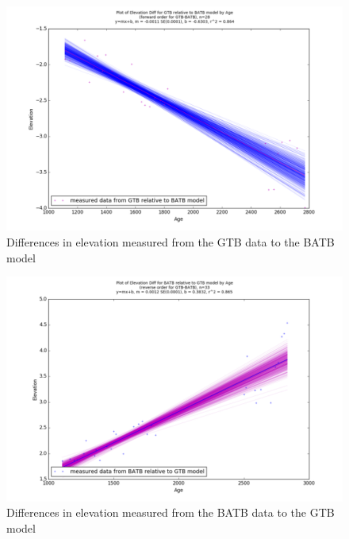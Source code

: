 \begin{figure}[h]
	\includegraphics[width=0.9\linewidth]{data/bothNonZero/withinSeventyFivePercent/gias/theGIA_GTB_relative_to_BATB.png}
	\caption{Differences in elevation measured from the GTB data to the BATB model}
	\label{fig:gias_GTBxBATB}
\end{figure}
\newpage


\begin{figure}[h]
	\includegraphics[width=0.9\linewidth]{data/bothNonZero/withinSeventyFivePercent/gias/theGIA_BATB_relative_to_GTB.png}
	\caption{Differences in elevation measured from the BATB data to the GTB model}
	\label{fig:gias_BATBxGTB}
\end{figure}
\newpage









